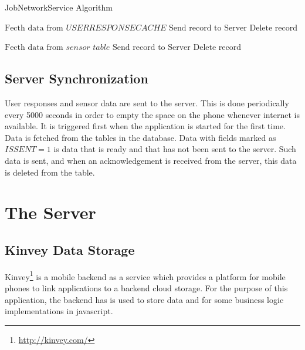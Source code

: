 \begin{algorithm}
\caption{JobNetworkService Algorithm}\label{nextday}
\begin{algorithmic}[1]
\State $ \text{Fecth data from } \textit{USERRESPONSECACHE}$
  \State $\text{Send record to Server}$
  \State $\text{Delete record}$  
  \EndIf
  \EndIf
 	\EndFor

 	 \State $ \text{Fecth data from } \textit{sensor table}$
  \State $\text{Send record to Server}$
  \State $\text{Delete record}$  
  \EndIf
  \EndIf
 	\EndFor
	
 	\EndFor
\EndProcedure
\end{algorithmic}
\end{algorithm}


\subsection{Server Synchronization} \label{job}

User responses and sensor data are sent to the server. This is done periodically every 5000 seconds in order to empty the space on the phone whenever internet is available. It is triggered first when the application is started for the first time. Data is fetched from the tables in the database. Data with fields marked as $\textit{ISSENT}=1$ is data that is ready and that has not been sent to the server. Such data is sent, and when an acknowledgement is received from the server, this data is deleted from the table.

\section{The Server}

\subsection{Kinvey Data Storage}

Kinvey\footnote{\url{http://kinvey.com/}} is a mobile backend as a service which provides a platform for mobile phones to link applications to a backend cloud storage. For the purpose of this application, the backend has is used to store data and for some business logic implementations in javascript.

